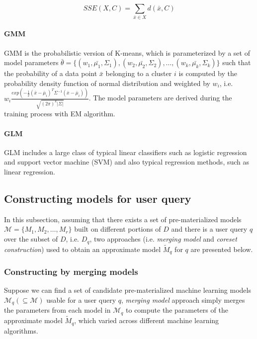 \begin{equation}\label{eq: sse_k_means}
    SSE(X, C) = \sum_{\bar{x} \in X}d(\bar{x}, C)
\end{equation}

\paragraph{GMM} GMM is the probabilistic version of K-means, which is parameterized by a set of model parameters $\bar{\theta} = \{(w_1, \bar{\mu_1}, \Sigma_1), (w_2, \bar{\mu_2}, \Sigma_2), \dots, (w_k, \bar{\mu_k}, \Sigma_k)\}$ such that the probability of a data point $\bar{x}$ belonging to a cluster $i$ is computed by the probability density function of normal distribution and weighted by $w_i$, i.e.  $w_i\frac{exp(-\frac{1}{2}(\bar{x}-\bar{\mu}_i)^T\Sigma^{-1}(\bar{x}-\bar{\mu}_i))}{\sqrt{(2\pi)^k|\Sigma|}}$. The model parameters are derived during the training process with EM algorithm.

\paragraph{GLM} GLM includes a large class of typical linear classifiers such as logistic regression and support vector machine (SVM) and also typical regression methods, such as linear regression.

\subsection{Constructing models for user query}
In this subsection, assuming that there exists a set of pre-materialized models $\mathcal{M} = \{M_1, M_2, \dots, M_r\}$ built on different portions of $D$ and there is a user query $q$ over the subset of $D$, i.e. $D_q$, two approaches (i.e. {\em merging model} and {\em coreset construction}) used to obtain an approximate model $\tilde{M}_q$ for $q$ are presented below. 

\subsubsection{Constructing by merging models}
Suppose we can find a set of candidate pre-materialized machine learning models $\mathcal{M}_q (\subseteq \mathcal{M})$ usable for a user query $q$, {\em merging model} approach simply merges the parameters from each model in $\mathcal{M}_q$ to compute the parameters of the approximate model $\tilde{M}_q$, which varied across different machine learning algorithms.

